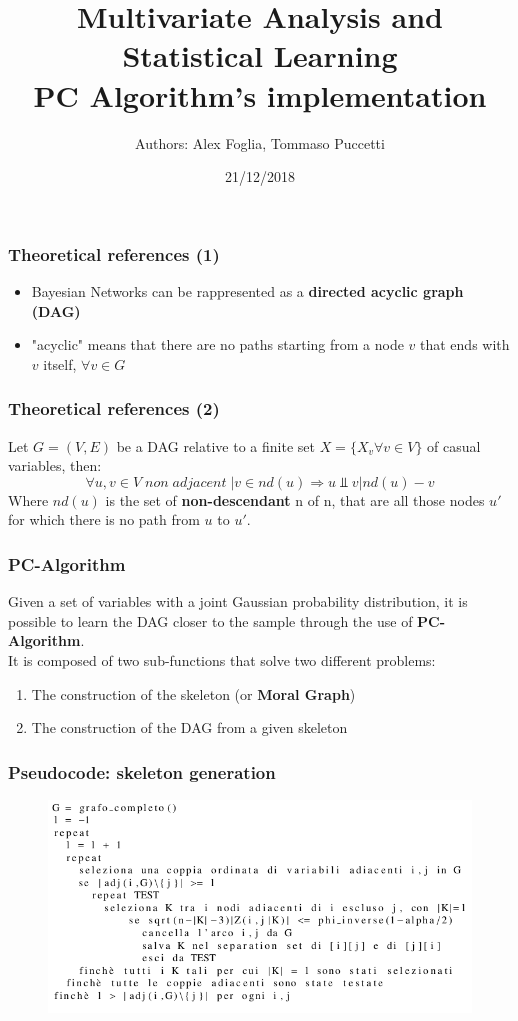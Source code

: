 \documentclass[xcolor ={table,usenames,dvipsnames}]{beamer}
\title{Multivariate Analysis and Statistical Learning \\PC Algorithm's implementation}
\author{Authors: Alex Foglia, Tommaso Puccetti}
\institute{Universit\`a  degli Studi di Firenze}
\date{21/12/2018}
\theoremstyle{definition}
\begin{document}
	
	\begin{frame}
		\maketitle
	\end{frame}

	\begin{frame}
		\frametitle{Theoretical references (1)}
		\begin{itemize}
			\item Bayesian Networks can be rappresented as a \textbf{directed acyclic graph (DAG)}
			\item "acyclic" means that there are no paths starting from a node $v$ that ends with $v$ itself, $\forall v \in G$
			
		\end{itemize}
	\end{frame}

	\begin{frame}
		\frametitle{Theoretical references (2)}
		Let $G = (V,E)$ be a DAG relative to a finite set  $X = \{X_v \forall v \in V\}$ of casual variables, then:
		$$
		\forall u,v \in V \;non\;adjacent\;| v \in nd(u) \Rightarrow u \Perp v | nd(u) - v
		$$
	Where $nd(u)$ is the set of \textbf{non-descendant} n of n, that are all those nodes $u'$ for which there is no path from $u$ to $u'$. \\
	\end{frame}

	\begin{frame}
		\frametitle{PC-Algorithm}
		Given a set of variables with a joint Gaussian probability distribution, it is possible to learn the DAG closer to the sample through the use of  \textbf{PC-Algorithm}. \\
		It is composed of two sub-functions that solve two different problems:
		\begin{enumerate}
			\item The construction of the skeleton (or \textbf{Moral Graph})
			\item The construction of the DAG from a given skeleton
		\end{enumerate}
	\end{frame}

	\begin{frame}[fragile]
		\frametitle{Pseudocode: skeleton generation}
	\begin{figure}[h!]
				\centering
				\includegraphics[scale=1.75]{img/pcalg.PNG}
			\end{figure}
	\end{frame}
\end{document}
